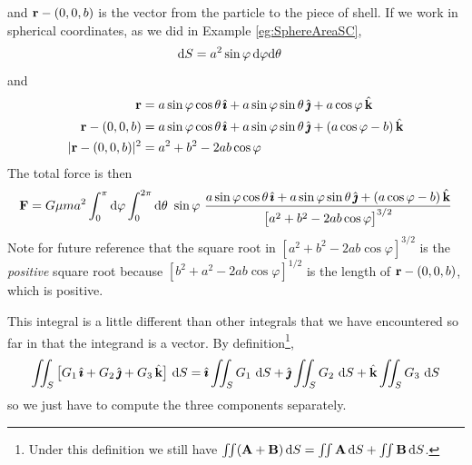 \begin{eg}
{\begin{efig}
\begin{center}
\end{center}
\end{efig}
}
and $\mathbf{r}-(0,0,b)$ is the vector from the
particle to the piece of shell. If we work in spherical coordinates, as we did in Example \ref{eg:SphereAreaSC},
\begin{align*}
\mathrm{d}S &= a^2\sin\varphi\,\mathrm{d}\varphi\mathrm{d}\theta 
\end{align*}
and
\begin{align*}
\mathbf{r} &= a\sin\varphi\cos\theta\,\hat{\pmb{\imath}} 
      + a\sin\varphi\sin\theta\,\hat{\pmb{\jmath}} 
      + a\cos\varphi\,\hat{\mathbf{k}} \\
\mathbf{r}-(0,0,b) &= a\sin\varphi\cos\theta\,\hat{\pmb{\imath}} 
      + a\sin\varphi\sin\theta\,\hat{\pmb{\jmath}} 
      + (a\cos\varphi-b)\,\hat{\mathbf{k}}  \\
|\mathbf{r}-(0,0,b)|^2 &= a^2+b^2 -2ab\cos\varphi 
\end{align*}
The total force is then
\begin{align*}
\vF = 
    G\mu m a^2\int_0^\pi\dee{\varphi} \int_0^{2\pi}\dee{\theta}\ \sin\varphi\ 
    \frac{a\sin\varphi\cos\theta\,\hi 
      + a\sin\varphi\sin\theta\,\hj 
      + (a\cos\varphi-b)\,\hk}
         {\big[a^2+b^2 -2ab\cos\varphi\big]^{3/2}}
\end{align*}
Note for future reference that the square root in
$[a^2+b^2 -2ab\cos\varphi]^{3/2}$ is the \emph{positive}
square root because $[b^2+a^2 -2ab\cos\varphi]^{1/2}$ is the length
of $\mathbf{r}-(0,0,b)$, which is positive. 

This integral is a little different than other integrals that we have 
encountered so far in that the integrand is a vector. By 
definition\footnote{Under this definition we still have 
$\iint (\mathbf{A}+\mathbf{B})\,\mathrm{d}S = \iint \mathbf{A}\,\mathrm{d}S + \iint\mathbf{B}\,\mathrm{d}S$.
},
\begin{equation*}
\iint_S \big[G_1\,\hat{\pmb{\imath}} + G_2\,\hat{\pmb{\jmath}} + G_3\,\hat{\mathbf{k}} \big]\ \mathrm{d}S
=\hat{\pmb{\imath}} \iint_S G_1\ \mathrm{d}S
+\hat{\pmb{\jmath}} \iint_S G_2\ \mathrm{d}S
+\hat{\mathbf{k}} \iint_S G_3\ \mathrm{d}S
\end{equation*}
so we just have to compute the three components separately. 


\end{eg}
